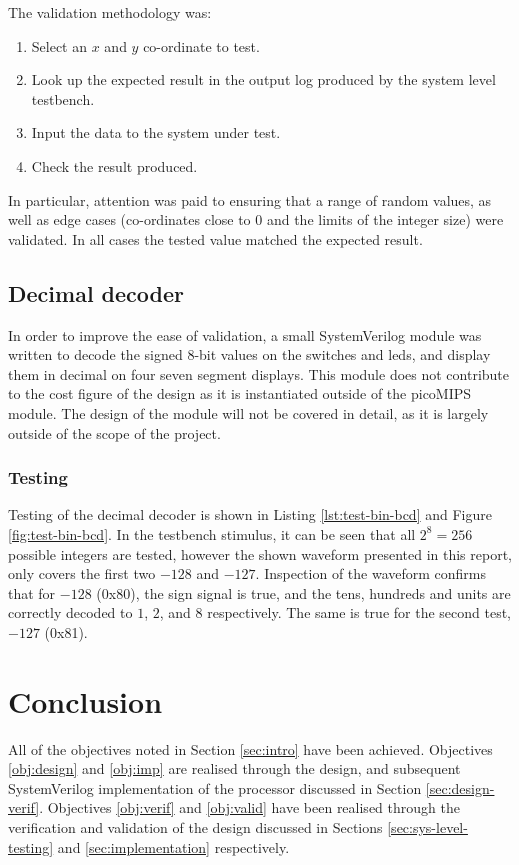The validation methodology was:
\begin{enumerate}
	 \item Select an $x$ and $y$ co-ordinate to test.
	 \item Look up the expected result in the output log produced by the system level testbench.
	 \item Input the data to the system under test.
	 \item Check the result produced.
\end{enumerate}
In particular, attention was paid to ensuring that a range of random values, as well as edge cases (co-ordinates close to $0$ and the limits of the integer size) were validated. In all cases the tested value matched the expected result.


\subsection{Decimal decoder}
In order to improve the ease of validation, a small SystemVerilog module was written to decode the signed 8-bit values on the switches and \glspl{led}, and display them in decimal on four seven segment displays. This module does not contribute to the cost figure of the design as it is instantiated outside of the picoMIPS module. The design of the module will not be covered in detail, as it is largely outside of the scope of the project.

\subsubsection{Testing}
Testing of the decimal decoder is shown in Listing \ref{lst:test-bin-bcd} and Figure \ref{fig:test-bin-bcd}. In the testbench stimulus, it can be seen that all $2^8 = 256$ possible integers are tested, however the shown waveform presented in this report, only covers the first two $-128$ and $-127$. Inspection of the waveform confirms that for $-128$ (0x80), the sign signal is true, and the tens, hundreds and units are correctly decoded to $1$, $2$, and $8$ respectively. The same is true for the second test, $-127$ (0x81).


\section{Conclusion}
All of the objectives noted in Section \ref{sec:intro} have been achieved. Objectives \ref{obj:design} and \ref{obj:imp} are realised through the design, and subsequent SystemVerilog implementation of the processor discussed in Section \ref{sec:design-verif}. Objectives \ref{obj:verif} and \ref{obj:valid} have been realised through the verification and validation of the design discussed in Sections \ref{sec:sys-level-testing} and \ref{sec:implementation} respectively.

